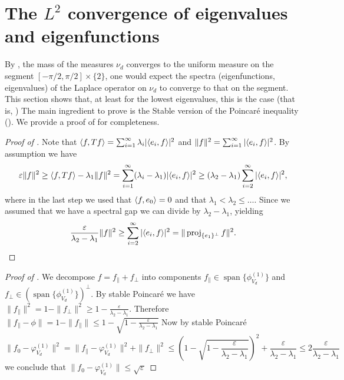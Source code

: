 
\section{The $L^2$ convergence of eigenvalues and eigenfunctions}




By , the mass of the measures $\nu_d$ converges to the uniform measure on the segment $[-\pi/2,\pi/2]\times\{2\}$, one would expect the spectra (eigenfunctions, eigenvalues) of the Laplace operator on $\nu_d$ to converge to that on the segment. This section shows that, at least for the lowest eigenvalues, this is the case (that is, ) The main ingredient to prove  is the Stable version of the Poincaré inequality (). We provide a proof of  for completeness.

\begin{proof}[Proof of ]
    Note that \( \langle f, Tf \rangle = \sum_{i=1}^\infty \lambda_i |\langle e_i, f \rangle|^2 \) and \( \|f\|^2 = \sum_{i=1}^\infty |\langle e_i, f \rangle|^2 \). By assumption we have
    \begin{equation*}
        \varepsilon \|f\|^2 
        \geq \langle f, Tf \rangle - \lambda_1 \|f\|^2
        = \sum_{i=1}^\infty (\lambda_i - \lambda_1) |\langle e_i, f \rangle|^2
        \geq (\lambda_2-\lambda_1) \sum_{i=2}^\infty  |\langle e_i, f \rangle|^2,
    \end{equation*}
    where in the last step we used that \( \langle f, e_0 \rangle=0 \) and that $\lambda_1 < \lambda_2 \le \dots$. Since we assumed that we have a spectral gap we can divide by $\lambda_2 - \lambda_1$, yielding
    \[
        \frac{\varepsilon}{\lambda_2 - \lambda_1} \|f\|^2 
        \geq  \sum_{i=2}^\infty  |\langle e_i, f \rangle|^2
        = \|\operatorname{proj}_{\{e_1\}^\perp} f\|^2.
    \]
\end{proof}

\begin{proof}[Proof of ]
We decompose \( f = f_{\parallel} + f_{\perp} \) into components \( f_{\parallel} \in \operatorname{span}\{\phi^{(1)}_{V_d}\} \) and \( f_\perp \in (\operatorname{span}\{\phi^{(1)}_{V_d}\})^\perp \). 
By stable Poincaré we have $\|f_\parallel\|^2 = 1 - \|f_\perp\|^2 \ge 1 - \frac{\varepsilon}{\lambda_2 - \lambda_1}$. 
Therefore $\|f_\parallel - \phi\| = 1-\|f_\parallel\| \le 1-\sqrt{1-\frac{\varepsilon}{\lambda_2 - \lambda_1}}$
Now by stable Poincaré
$$
\|f_0 - \varphi^{(1)}_{V_d}\|^2 
= \|f_\parallel - \varphi^{(1)}_{V_d}\|^2 + \|f_\perp\|^2
\le (1-\sqrt{1-\frac{\varepsilon}{\lambda_2 - \lambda_1}})^2 + \frac{\varepsilon}{\lambda_2 - \lambda_1}
\le 2 \frac{\varepsilon}{\lambda_2 - \lambda_1}
$$
we conclude that $\|f_0 - \varphi^{(1)}_{V_d}\| \le \sqrt{\varepsilon}$
\end{proof}

